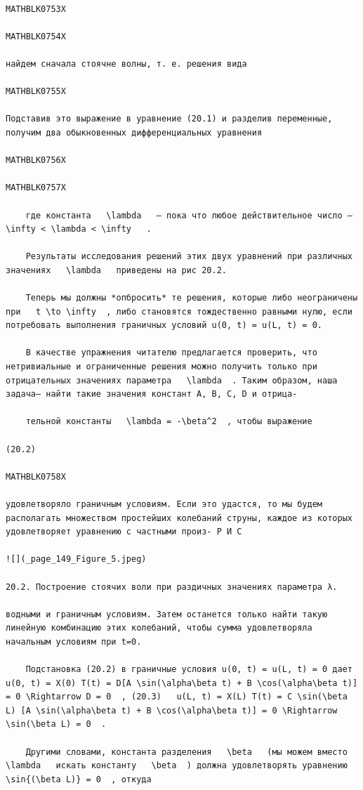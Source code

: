 \documentclass[
]{article}
\begin{document}
\begin{verbatim}

MATHBLK0753X

MATHBLK0754X

найдем сначала стоячне волны, т. е. решения вида

MATHBLK0755X

Подставив это выражение в уравнение (20.1) и разделив переменные, получим два обыкновенных дифференциальных уравнения

MATHBLK0756X

MATHBLK0757X

    где константа   \lambda   — пока что любое действительное число —   \infty < \lambda < \infty   .

    Результаты исследования решений этих двух уравнений при различных значениях   \lambda   приведены на рис 20.2.

    Теперь мы должны *опбросить* те решения, которые либо неограничены при   t \to \infty  , либо становятся тождественно равными нулю, если потребовать выполнения граничных условий u(0, t) = u(L, t) = 0.

    В качестве упражнения читателю предлагается проверить, что нетривиальные и ограниченные решения можно получить только при отрицательных значениях параметра   \lambda  . Таким образом, наша задача— найти такие значения констант A, B, C, D и отрица-

    тельной константы   \lambda = -\beta^2  , чтобы выражение

(20.2)

MATHBLK0758X

удовлетворяло граничным условиям. Если это удастся, то мы будем располагать множеством простейших колебаний струны, каждое из которых удовлетворяет уравнению с частными произ- Р И С

![](_page_149_Figure_5.jpeg)

20.2. Построение стоячих воли при раздичных значениях параметра λ.

водными и граничным условиям. Затем останется только найти такую линейную комбинацию этих колебаний, чтобы сумма удовлетворяла начальным условиям при t=0.

    Подстановка (20.2) в граничные условия u(0, t) = u(L, t) = 0 дает   u(0, t) = X(0) T(t) = D[A \sin(\alpha\beta t) + B \cos(\alpha\beta t)] = 0 \Rightarrow D = 0  , (20.3)   u(L, t) = X(L) T(t) = C \sin(\beta L) [A \sin(\alpha\beta t) + B \cos(\alpha\beta t)] = 0 \Rightarrow \sin(\beta L) = 0  .

    Другими словами, константа разделения   \beta   (мы можем вместо   \lambda   искать константу   \beta  ) должна удовлетворять уравнению   \sin{(\beta L)} = 0  , откуда


\end{verbatim}
\end{document}
